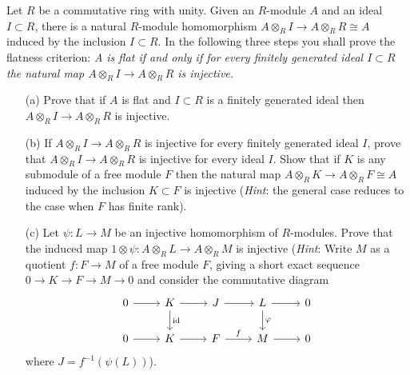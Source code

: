 \begin{prob}[F2013-Q3]
    Let \(R\) be a commutative ring with unity. Given an \(R\)-module \(A\) and an ideal \(I \subset R\), there is a natural \(R\)-module homomorphism \(A \otimes_R I \to A \otimes_R R \cong A\) induced by the inclusion \(I \subset R\). In the following three steps you shall prove the flatness criterion: \textit{A is flat if and only if for every finitely generated ideal \(I \subset R\) the natural map \(A \otimes_R I \to A \otimes_R R\) is injective.}
    \begin{itemize}
        \item[(a)] Prove that if \(A\) is flat and \(I \subset R\) is a finitely generated ideal then \(A \otimes_R I \to A \otimes_R R\) is injective.
        \item[(b)] If \(A \otimes_R I \to A \otimes_R R\) is injective for every finitely generated ideal \(I\), prove that \(A \otimes_R I \to A \otimes_R R\) is injective for every ideal \(I\). Show that if \(K\) is any submodule of a free module \(F\) then the natural map \(A \otimes_R K \to A \otimes_R F \cong A\) induced by the inclusion \(K \subset F\) is injective (\textit{Hint}: the general case reduces to the case when \(F\) has finite rank).
        \item[(c)] Let \(\psi : L \to M\) be an injective homomorphism of \(R\)-modules. Prove that the induced map \(1 \otimes \psi : A \otimes_R L \to A \otimes_R M\) is injective (\textit{Hint}: Write \(M\) as a quotient \(f : F \to M\) of a free module \(F\), giving a short exact sequence \(0 \to K \to F \to M \to 0\) and consider the commutative diagram
        \[\begin{tikzcd}
            0 & K & J & L & 0 \\
            0 & K & F & M & 0
            \arrow[from=1-1, to=1-2]
            \arrow[from=1-2, to=1-3]
            \arrow["{\text{id}}", from=1-2, to=2-2]
            \arrow[from=1-3, to=1-4]
            \arrow[from=1-4, to=1-5]
            \arrow["\varphi", from=1-4, to=2-4]
            \arrow[from=2-1, to=2-2]
            \arrow[from=2-2, to=2-3]
            \arrow["f", from=2-3, to=2-4]
            \arrow[from=2-4, to=2-5]
        \end{tikzcd}\]
        where \(J = f^{-1}(\psi(L))\)).
    \end{itemize}
\end{prob}




